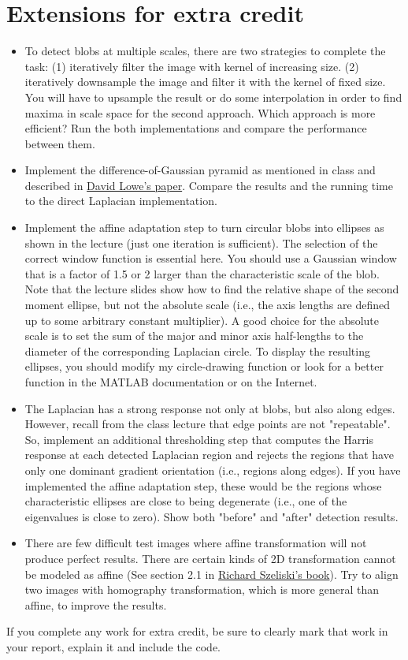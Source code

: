 \documentclass[10pt,letterpaper]{article}
\begin{document}
\section{Extensions for extra credit}
\begin{itemize}
\item To detect blobs at multiple scales, there are two strategies to complete the task: (1) iteratively filter the image with kernel of increasing size. (2) iteratively downsample the image and filter it with the kernel of fixed size. You will have to upsample the result or do some interpolation in order to find maxima in scale space for the second approach. Which approach is more efficient? Run the both implementations and compare the performance between them.

\item Implement the difference-of-Gaussian pyramid as mentioned in class and described in \href{http://www.cs.ubc.ca/~lowe/papers/ijcv04.pdf}{David Lowe's paper}. Compare the results and the running time to the direct Laplacian implementation.

\item Implement the affine adaptation step to turn circular blobs into ellipses as shown in the lecture (just one iteration is sufficient). The selection of the correct window function is essential here. You should use a Gaussian window that is a factor of 1.5 or 2 larger than the characteristic scale of the blob. Note that the lecture slides show how to find the relative shape of the second moment ellipse, but not the absolute scale (i.e., the axis lengths are defined up to some arbitrary constant multiplier). A good choice for the absolute scale is to set the sum of the major and minor axis half-lengths to the diameter of the corresponding Laplacian circle. To display the resulting ellipses, you should modify my circle-drawing function or look for a better function in the MATLAB documentation or on the Internet.

\item The Laplacian has a strong response not only at blobs, but also along edges. However, recall from the class lecture that edge points are not "repeatable". So, implement an additional thresholding step that computes the Harris response at each detected Laplacian region and rejects the regions that have only one dominant gradient orientation (i.e., regions along edges). If you have implemented the affine adaptation step, these would be the regions whose characteristic ellipses are close to being degenerate (i.e., one of the eigenvalues is close to zero). Show both "before" and "after" detection results.

\item There are few difficult test images where affine transformation will not produce perfect results. There are certain kinds of 2D transformation cannot be modeled as affine (See section 2.1 in \href{http://szeliski.org/Book/drafts/SzeliskiBook_20100903_draft.pdf}{Richard Szeliski's book}). Try to align two images with homography transformation, which is more general than affine, to improve the results.
\end{itemize}
If you complete any work for extra credit, be sure to clearly mark that work in your report, explain it and include the code.
\end{document}
